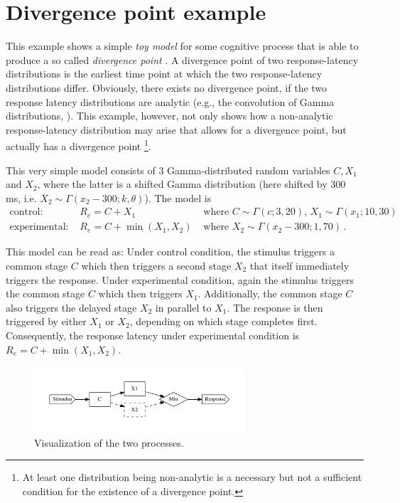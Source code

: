 \section{Divergence point example}
This example shows a simple \emph{toy model} for some cognitive process that is able to produce a
so called \emph{divergence point} \cite{Reingold2012}. A divergence point of two response-latency
distributions is the earliest time point at which the two response-latency distributions differ. Obviously, 
there exists no divergence point, if the two response latency distributions are analytic 
(e.g., the convolution of Gamma distributions, \cite{Gelooven1999}). This example, however,
not only shows how a non-analytic response-latency distribution may arise that allows for a 
divergence point, but actually has a divergence point%
\footnote{At least one distribution being non-analytic is a necessary but not a sufficient
condition for the existence of a divergence point.}. 

This very simple model consists of 3 Gamma-distributed random variables $C, X_1$ and $X_2$,
where the latter is a shifted Gamma distribution (here shifted by $300$ ms, i.e. 
$X_2 \sim \Gamma(x_2-300; k, \theta)$).  The model is
\begin{align}
 \text{control: } & R_c = C + X_1 & \text{ where } C \sim \Gamma(c; 3, 20),\,X_1\sim\Gamma(x_1; 10,30)\\
 \text{experimental: } & R_e = C + \min(X_1, X_2) & \text{ where } X_2 \sim\Gamma(x_2-300; 1, 70)\,.
\end{align}

This model can be read as: Under control condition, the stimulus triggers a common stage $C$ which then 
triggers a second stage $X_2$ that itself immediately triggers the response. Under experimental condition,
again the stimulus triggers the common stage $C$ which then triggers $X_1$. Additionally, the common
stage $C$ also triggers the delayed stage $X_2$ in parallel to $X_1$. The response is then triggered by 
either $X_1$ or $X_2$, depending on which stage completes first. Consequently, the response latency
under experimental condition is $R_e = C + \min(X_1,X_2)$.

\begin{figure} [!ht]
 \centering
 \includegraphics[width=0.7\textwidth]{pod_graph.pdf}
 \caption{Visualization of the two processes.} \label{fig:podgraph}
\end{figure}

